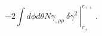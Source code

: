 \begin{equation}
\left.
-2 \int d\phi d\theta N \gamma_{,\rho\rho} \ \delta
\gamma^2 \ \right|^{r_{++}}_{r_+} \  .
\label{var}
\end{equation}

